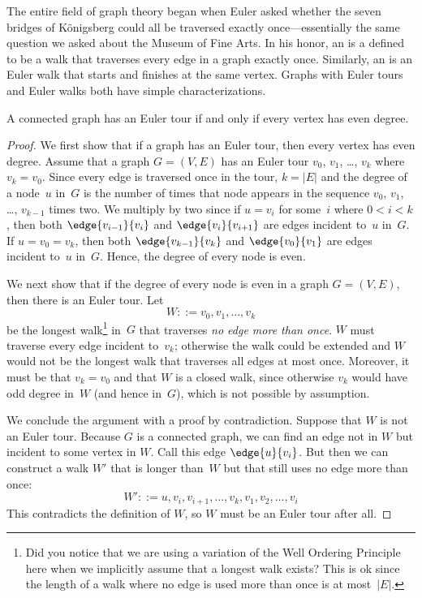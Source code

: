 The entire field of graph theory began when Euler asked whether the
seven bridges of K\"onigsberg could all be traversed exactly
once---essentially the same question we asked about the Museum of Fine
Arts.  In his honor, an  is a defined to be a walk
that traverses every edge in a graph exactly once.  Similarly, an
 is an Euler walk that starts and finishes at the
same vertex.  Graphs with Euler tours and Euler walks both have simple
characterizations.
\begin{theorem}\label{thm:euler-tour}
A connected graph has an Euler tour if and only if every vertex has
even degree.
\end{theorem}

\begin{proof}
We first show that if a graph has an Euler tour, then every vertex has
even degree.  Assume that a graph $G = (V, E)$ has an Euler tour
$v_0$, $v_1$, \dots, $v_k$ where $v_k = v_0$.  Since every edge is
traversed once in the tour, $k = |E|$ and the degree of a node~$u$
in~$G$ is the number of times that node appears in the sequence $v_0$,
$v_1$, \dots, $v_{k-1}$ times two.  We multiply by two since if $u =
v_i$ for some~$i$ where $0 < i < k$, then both $\edge{v_{i - 1}}{v_i}$
and $\edge{v_i}{v_{i + 1}}$ are edges incident to~$u$ in~$G$.  If $u =
v_0 = v_k$, then both $\edge{v_{k - 1}}{v_k}$ and $\edge{v_0}{v_1}$
are edges incident to~$u$ in~$G$.  Hence, the degree of every node is
even.

We next show that if the degree of every node is even in a graph $G =
(V, E)$, then there is an Euler tour.  Let
\begin{equation*}
    W ::= v_0, v_1, \dots, v_k
\end{equation*}
be the longest walk\footnote{Did you notice that we are using a
  variation of the Well Ordering Principle here when we implicitly
  assume that a longest walk exists?  This is ok since the length of a
  walk where no edge is used more than once is at most~$|E|$.}  in~$G$
that traverses \emph{no edge more than once}.  $W$ must traverse every
edge incident to~$v_k$; otherwise the walk could be extended and $W$
would not be the longest walk that traverses all edges at most once.
Moreover, it must be that $v_k = v_0$ and that $W$ is a closed walk,
since otherwise $v_k$ would have odd degree in~$W$ (and hence in~$G$),
which is not possible by assumption.

We conclude the argument with a proof by contradiction.  Suppose that
$W$ is not an Euler tour.  Because $G$ is a connected graph, we can
find an edge not in $W$ but incident to some vertex in $W$.  Call this
edge $\edge{u}{v_i}$.  But then we can construct a walk $W'$ that is
longer than~$W$ but that still uses no edge more than once:
\begin{equation*}
    W' ::= u, v_i, v_{i + 1}, \dots, v_k, v_1, v_2, \dots, v_i
\end{equation*}
%
This contradicts the definition of $W$, so $W$ must be an
Euler tour after all.
\end{proof}

